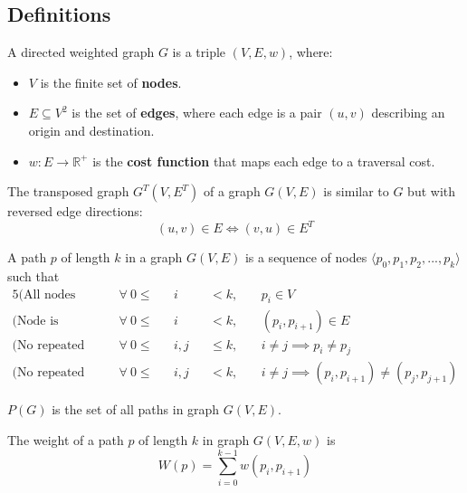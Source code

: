 \subsection{Definitions}
\begin{definition}
    A directed weighted graph $G$ is a triple $(V, E, w)$, where:
    \begin{itemize}
        \item $V$ is the finite set of \textbf{nodes}.
        \item $E \subseteq V^2$ is the set of \textbf{edges}, where each edge is a pair $(u,v)$ describing an origin and destination.
        \item $w: E \rightarrow \mathbb{R}^+$ is the \textbf{cost function} that maps each edge to a traversal cost.
    \end{itemize}
\end{definition}
\begin{definition}
    The transposed graph $G^T(V, E^T)$ of a graph $G(V, E)$ is similar to $G$ but with reversed edge directions:
    \begin{equation*}
        (u, v) \in E \iff (v, u) \in E^T
    \end{equation*}
\end{definition}
\begin{definition}[Path]
    A path $p$ of length $k$ in a graph $G(V,E)$ is a sequence of nodes $\langle p_0,p_1,p_2,...,p_k\rangle$ such that
    \begin{alignat*}{5}
        \text{(All nodes belong to the graph)}       ~~&\forall~0 \leq &&i   &&<    k,&&~p_i \in V \\
        \text{(Node is reachable from previous node)}~~&\forall~0 \leq &&i   &&<    k,&&~(p_i, p_{i+1}) \in E \\
        \text{(No repeated nodes)}                   ~~&\forall~0 \leq &&i,j &&\leq k,&&~i\neq j \implies p_i \neq p_j \\
        \text{(No repeated edges)}                   ~~&\forall~0 \leq &&i,j &&<    k,&&~i\neq j \implies (p_i,p_{i+1}) \neq (p_j, p_{j+1})
    \end{alignat*}
\end{definition}
\begin{definition}
    $P(G)$ is the set of all paths in graph $G(V,E)$.
\end{definition}
\begin{definition}
    The weight of a path $p$ of length $k$ in graph $G(V,E,w)$ is
    \begin{equation*}
        W(p) = \sum_{i=0}^{k-1}{w(p_i, p_{i+1})}
    \end{equation*}
\end{definition}
